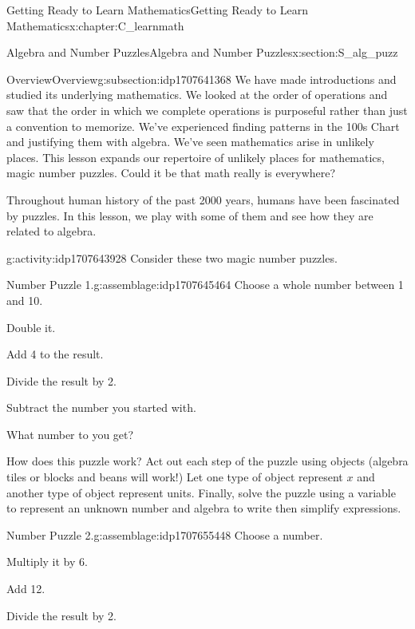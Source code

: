 \documentclass[oneside,10pt,]{book}
\numberwithin{equation}{chapter}
\begin{document}
\begin{chapterptx}{Getting Ready to Learn Mathematics}{}{Getting Ready to Learn Mathematics}{}{}{x:chapter:C_learnmath}
\typeout{************************************************}
%
\begin{sectionptx}{Algebra and Number Puzzles}{}{Algebra and Number Puzzles}{}{}{x:section:S_alg_puzz}
%
%
\typeout{************************************************}
\typeout{************************************************}
%
\begin{subsectionptx}{Overview}{}{Overview}{}{}{g:subsection:idp1707641368}
We have made introductions and studied its underlying mathematics. We looked at the order of operations and saw that the order in which we complete operations is purposeful rather than just a convention to memorize. We've experienced finding patterns in the 100s Chart and justifying them with algebra. We've seen mathematics arise in unlikely places. This lesson expands our repertoire of unlikely places for mathematics, magic number puzzles. Could it be that math really is everywhere?%
\par
Throughout human history of the past 2000 years, humans have been fascinated by puzzles. In this lesson, we play with some of them and see how they are related to algebra.%
\end{subsectionptx}
\begin{activity}{}{g:activity:idp1707643928}%
Consider these two magic number puzzles. \begin{assemblage}{Number Puzzle 1.}{g:assemblage:idp1707645464}%
Choose a whole number between 1 and 10.%
\par
Double it.%
\par
Add 4 to the result.%
\par
Divide the result by 2.%
\par
Subtract the number you started with.%
\par
What number to you get?%
\end{assemblage}
%
\par
How does this puzzle work? Act out each step of the puzzle using objects (algebra tiles or blocks and beans will work!) Let one type of object represent \(x\) and another type of object represent units. Finally, solve the puzzle using a variable to represent an unknown number and algebra to write then simplify expressions. \begin{assemblage}{Number Puzzle 2.}{g:assemblage:idp1707655448}%
Choose a number.%
\par
Multiply it by 6.%
\par
Add 12.%
\par
Divide the result by 2.%

\end{assemblage}
\end{activity}
\end{sectionptx}
\end{chapterptx}
\end{document}
